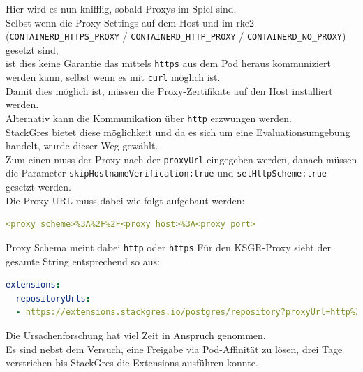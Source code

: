 \begin{flushleft}
    Hier wird es nun knifflig, sobald Proxys im Spiel sind.\\
    Selbst wenn die Proxy-Settings auf dem Host und im \gls{rke2} (\texttt{CONTAINERD\_HTTPS\_PROXY} / \texttt{CONTAINERD\_HTTP\_PROXY} / \texttt{CONTAINERD\_NO\_PROXY}) gesetzt sind,\\
    ist dies keine Garantie das mittels \texttt{https} aus dem Pod heraus kommuniziert werden kann, selbst wenn es mit \texttt{curl} möglich ist.\\
    Damit dies möglich ist, müssen die Proxy-Zertifikate auf den Host installiert werden.\\
    Alternativ kann die Kommunikation über \texttt{http} erzwungen werden.\\
    StackGres bietet diese möglichkeit und da es sich um eine Evaluationsumgebung handelt, wurde dieser Weg gewählt.\\
    Zum einen muss der Proxy nach der \texttt{proxyUrl} eingegeben werden, danach müssen die Parameter \texttt{skipHostnameVerification:true} und \texttt{setHttpScheme:true} gesetzt werden.\\
    Die Proxy-URL muss dabei wie folgt aufgebaut werden:
\lstset{style=gra_codestyle}
\begin{lstlisting}[language=yaml, caption=StackGres - values.yaml - Extension proxyUrl,captionpos=b,label={lst:stackgres_extension_proxyurl},breaklines=true]
<proxy scheme>%3A%2F%2F<proxy host>%3A<proxy port>
\end{lstlisting}
    Proxy Schema meint dabei \texttt{http} oder \texttt{https}
    Für den KSGR-Proxy sieht der gesamte String entsprechend so aus:
\lstset{style=gra_codestyle}
\begin{lstlisting}[language=yaml, caption=StackGres - values.yaml - Extension Proxy,captionpos=b,label={lst:stackgres_extension_proxy},breaklines=true]
extensions:
  repositoryUrls:
  - https://extensions.stackgres.io/postgres/repository?proxyUrl=http%3A%2F%2Fsproxy.sivc.first-it.ch%3A8080?skipHostnameVerification:true&setHttpScheme:true
\end{lstlisting}
    Die Ursachenforschung hat viel Zeit in Anspruch genommen.\\
    Es sind nebst dem Versuch, eine Freigabe via Pod-Affinität zu lösen, drei Tage verstrichen bis StackGres die Extensions ausführen konnte.
\end{flushleft}
